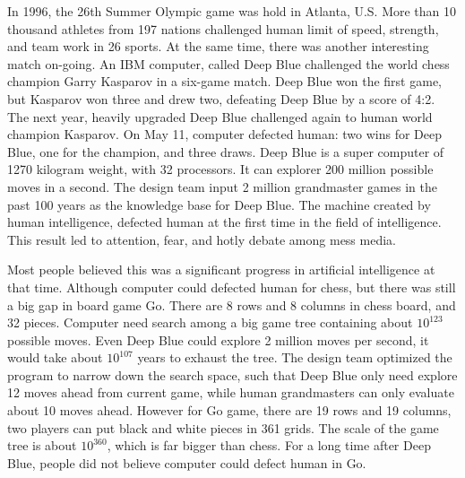 \documentclass{article}
\begin{document}
In 1996, the 26th Summer Olympic game was hold in Atlanta, U.S. More than 10 thousand athletes from 197 nations challenged human limit of speed, strength, and team work in 26 sports. At the same time, there was another interesting match on-going. An IBM computer, called Deep Blue challenged the world chess champion Garry Kasparov in a six-game match. Deep Blue won the first game, but Kasparov won three and drew two, defeating Deep Blue by a score of 4:2. The next year, heavily upgraded Deep Blue challenged again to human world champion Kasparov. On May 11, computer defected human: two wins for Deep Blue, one for the champion, and three draws. Deep Blue is a super computer of 1270 kilogram weight, with 32 processors. It can explorer 200 million possible moves in a second. The design team input 2 million grandmaster games in the past 100 years as the knowledge base for Deep Blue. The machine created by human intelligence, defected human at the first time in the field of intelligence. This result led to attention, fear, and hotly debate among mess media.

Most people believed this was a significant progress in artificial intelligence at that time. Although computer could defected human for chess, but there was still a big gap in board game Go. There are 8 rows and 8 columns in chess board, and 32 pieces. Computer need search among a big game tree containing about $10^{123}$ possible moves. Even Deep Blue could explore 2 million moves per second, it would take about $10^{107}$ years to exhaust the tree. The design team optimized the program to narrow down the search space, such that Deep Blue only need explore 12 moves ahead from current game, while human grandmasters can only evaluate about 10 moves ahead. However for Go game, there are 19 rows and 19 columns, two players can put black and white pieces in 361 grids. The scale of the game tree is about $10^{360}$, which is far bigger than chess. For a long time after Deep Blue, people did not believe computer could defect human in Go.
\end{document}
